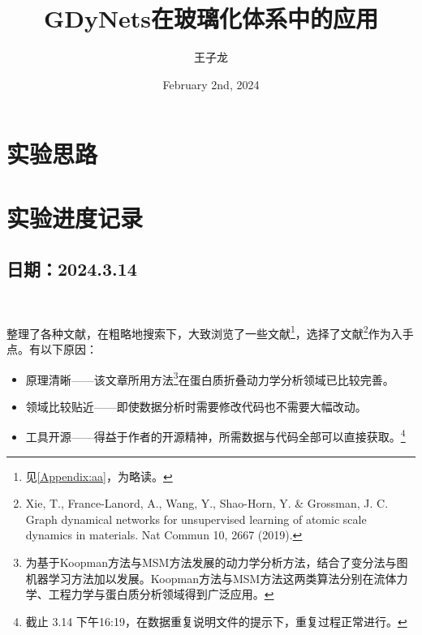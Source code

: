 \documentclass[
	12pt, %
]{fphw}
\title{GDyNets在玻璃化体系中的应用} %
\author{王子龙} %
\date{February 2nd, 2024} %
\institute{实验记录} %
\begin{document}
\maketitle %

\begin{abstract}
	
\end{abstract}





\section{实验思路}\label{Cha:a}


\newpage
\section{实验进度记录}\label{Cha:b}
\subsection*{日期：2024.3.14}~

整理了各种文献，在粗略地搜索下，大致浏览了一些文献\footnote{见\ref{Appendix:aa}，为略读。}，选择了文献\footnote{Xie, T., France-Lanord, A., Wang, Y., Shao-Horn, Y. \& Grossman, J. C. Graph dynamical networks for unsupervised learning of atomic scale dynamics in materials. Nat Commun 10, 2667 (2019).
}作为入手点。有以下原因：

\begin{itemize}
	\item 原理清晰——该文章所用方法\footnote{为基于Koopman方法与MSM方法发展的动力学分析方法，结合了变分法与图机器学习方法加以发展。Koopman方法与MSM方法这两类算法分别在流体力学、工程力学与蛋白质分析领域得到广泛应用。}在蛋白质折叠动力学分析领域已比较完善。
	\item 领域比较贴近——即使数据分析时需要修改代码也不需要大幅改动。
	\item 工具开源——得益于作者的开源精神，所需数据与代码全部可以直接获取。\footnote{截止 3.14 下午16:19，在数据重复说明文件的提示下，重复过程正常进行。} 
\end{itemize}
\end{document}
